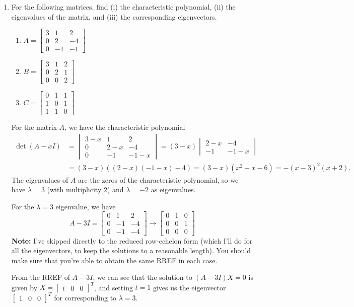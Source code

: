 \documentclass[12pt]{article}
\newcommand{\bbm}{\begin{bmatrix}}
\newcommand{\ebm}{\end{bmatrix}}
\newcommand{\bvm}{\begin{vmatrix}}
\newcommand{\evm}{\end{vmatrix}}
\begin{document}
\thispagestyle{fancy}

 \begin{enumerate}
  \item For the following matrices, find (i) the characteristic polynomial, (ii) the eigenvalues of the matrix, and (iii) the corresponding eigenvectors.
\begin{multicols}{3}

\begin{enumerate}
  \item $A = \bbm 3& 1&2\\0&2&-4\\0& -1&-1\ebm$
  \item $B = \bbm 3 & 1 & 2\\0& 2 & 1\\0& 0& 2\ebm$
  \item $C = \bbm 0&1&1\\1&0&1\\1&1&0\ebm$
 \end{enumerate}
\end{multicols}

\bigskip

For the matrix $A$, we have the characteristic polynomial
\begin{align*}
 \det(A-xI) & = \bvm 3-x & 1 & 2\\0 & 2-x&-4\\0 & -1 & -1-x\evm = (3-x)\bvm 2-x&-4\\-1&-1-x\evm\\
& = (3-x)((2-x)(-1-x)-4) = (3-x)(x^2-x-6) = -(x-3)^2(x+2).
\end{align*}
The eigenvalues of $A$ are the zeros of the characteristic polynomial, so we have $\lambda = 3$ (with multiplicity 2) and $\lambda = -2$ as eigenvalues.

For the $\lambda =3$ eigenvalue, we have
\[
 A-3I = \bbm 0&1&2\\0&-1&-4\\0&-1&-4\ebm \longrightarrow \bbm 0&1&0\\0&0&1\\0&0&0\ebm
\]
\textbf{Note:} I've skipped directly to the reduced row-echelon form (which I'll do for all the eigenvectors, to keep the solutions to a reasonable length). You should make sure that you're able to obtain the same RREF in each case.

From the RREF of $A-3I$, we can see that the solution to $(A-3I)X = 0$ is given by $X = \bbm t&0&0\ebm^T$, and setting $t=1$ gives us the eigenvector $\bbm 1&0&0\ebm^T$ for corresponding to $\lambda=3$.


\end{enumerate}
\end{document}
